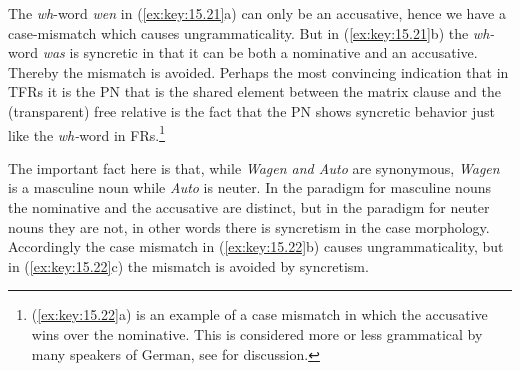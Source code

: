 \documentclass[output=paper]{langsci/langscibook}
\begin{document}
\begin{refcontext}
\ea\label{ex:key:15.21}
    \z
\z
The \emph{wh}{}-word \emph{wen} in (\ref{ex:key:15.21}a) can only be an accusative, hence we
have a case-mismatch which causes ungrammaticality. But in (\ref{ex:key:15.21}b) the
\emph{wh-}word \emph{was} is syncretic in that it can be both a nominative and
an accusative. Thereby the mismatch is avoided. Perhaps the most convincing
indication that in \glspl{TFR} it is the \gls{PN} that is the shared element
between the matrix clause and the (transparent) free relative is the fact
that the \gls{PN} shows syncretic behavior just like the \emph{wh-}word in
\glspl{FR}.\footnote{(\ref{ex:key:15.22}a) is an example of a case mismatch in which the
    accusative wins over the nominative. This is considered more or less
    grammatical by many speakers of German, see \citet{Vogel2001} for
discussion.}

\ea\label{ex:key:15.22}
    \z
\z
The important fact here is that, while \emph{Wagen and Auto} are synonymous,
\emph{Wagen} is a masculine noun while \emph{Auto} is neuter. In the paradigm
for masculine nouns the nominative and the accusative are distinct, but in the
paradigm for neuter nouns they are not, in other words there is syncretism in
the case morphology. Accordingly the case mismatch in (\ref{ex:key:15.22}b) causes
ungrammaticality, but in (\ref{ex:key:15.22}c) the mismatch is avoided by syncretism.


\end{refcontext}
\end{document}
